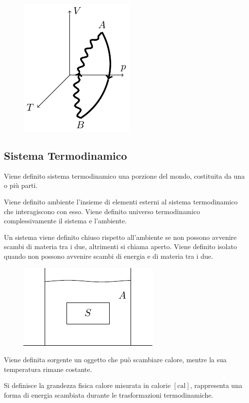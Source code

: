 \documentclass{article}
\numberwithin{equation}{subsection}
\begin{document}
\begin{figure}[H]%
    \centering
    \includegraphics{stato-termodinamico.pdf}%
\end{figure}

\subsection{Sistema Termodinamico}
Viene definito sistema termodinamico una porzione del mondo, costituita da una o più parti. 

Viene definito ambiente l'insieme di elementi esterni al sistema termodinamico che interagiscono con esso. 
Viene definito universo termodinamico complessivamente 
il sistema e l'ambiente. 



Un sistema viene definito chiuso rispetto all'ambiente 
se non possono avvenire scambi di materia tra i due, altrimenti si chiama aperto. Viene 
definito isolato quando non possono avvenire scambi di energia e di materia  
tra i due. 


\begin{figure}[H]%
    \centering
    \includegraphics{sistema-termodinamico.pdf}%
\end{figure}

Viene definita sorgente un oggetto che può scambiare calore, 
mentre la sua temperatura rimane costante. 


Si definisce la grandezza fisica calore misurata 
in calorie $[\mathrm{cal}]$, rappresenta una forma di energia scambiata durante le trasformazioni termodinamiche. 
\end{document}

